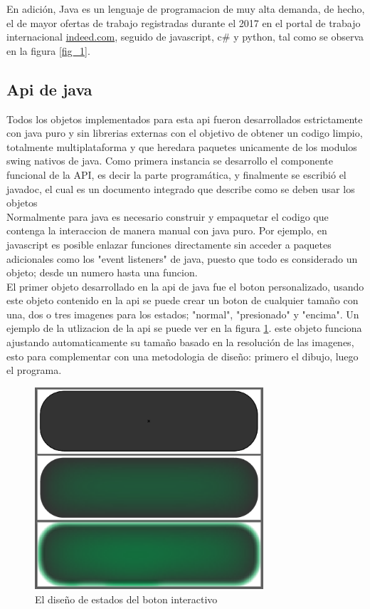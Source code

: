 En adición, Java es un lenguaje de programacion de muy alta demanda, de hecho, el de mayor ofertas de trabajo registradas durante el 2017 en el portal de trabajo internacional \href{https://co.indeed.com/?r=us}{indeed.com}, seguido de javascript, c\# y python, tal como se observa en la figura \ref{fig_1}.

\subsection{Api de java}
Todos los objetos implementados para esta api fueron desarrollados estrictamente con java puro y sin librerias externas con el objetivo de obtener un codigo limpio, totalmente multiplataforma y que heredara paquetes unicamente de los modulos swing nativos de java. Como primera instancia se desarrollo el componente funcional de la API, es decir la parte programática, y finalmente se escribió el javadoc, el cual es un documento integrado que describe como se deben usar los objetos 
\vspace{0.5cm}\\
Normalmente para java es necesario construir y empaquetar el codigo que contenga la interaccion de manera manual con java puro. Por ejemplo, en javascript es posible enlazar funciones directamente sin acceder a paquetes adicionales como los "event listeners" de java, puesto que todo es considerado un objeto; desde un numero hasta una funcion.	
\vspace{0.5cm}\\
El primer objeto desarrollado en la api de java fue el boton personalizado, usando este objeto contenido en la api se puede crear un boton de cualquier tamaño con una, dos o tres imagenes para los estados; "normal", "presionado" y "encima". Un ejemplo de la utlizacion de la api se puede ver en la figura \ref{fig_2}. este objeto funciona ajustando automaticamente su tamaño basado en la resolución de las imagenes, esto para complementar con una metodologia de diseño: primero el dibujo, luego el programa.

\begin{figure}[htbp]
	\centerline{\includegraphics[width=8.5cm]{./figuras/boton.png}}
	\caption{El diseño de estados del boton interactivo}
	\label{fig_2}
\end{figure}

